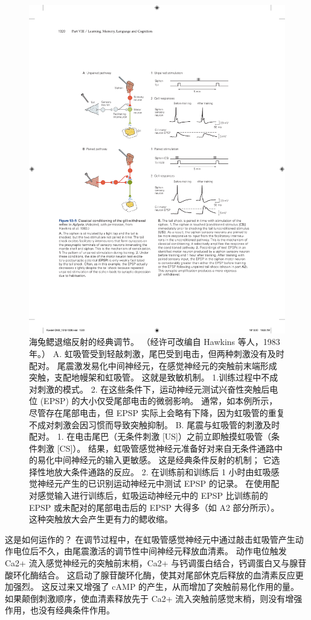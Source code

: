 \begin{figure}[htbp]
	\centering
	\includegraphics[width=0.75\linewidth]{chap53/fig_53_5}
	\caption{海兔鳃退缩反射的经典调节。 （经许可改编自 Hawkins 等人，1983 年。） A. 虹吸管受到轻敲刺激，尾巴受到电击，但两种刺激没有及时配对。 尾震激发易化中间神经元，在感觉神经元的突触前末端形成突触，支配地幔架和虹吸管。 这就是致敏机制。 1.训练过程中不成对刺激的模式。 2. 在这些条件下，运动神经元测试兴奋性突触后电位 (EPSP) 的大小仅受尾部电击的微弱影响。 通常，如本例所示，尽管存在尾部电击，但 EPSP 实际上会略有下降，因为虹吸管的重复不成对刺激会因习惯而导致突触抑制。 B. 尾震与虹吸管的刺激及时配对。 1. 在电击尾巴（无条件刺激 [US]）之前立即触摸虹吸管（条件刺激 [CS]）。 结果，虹吸管感觉神经元准备好对来自无条件通路中的易化中间神经元的输入更敏感。 这是经典条件反射的机制； 它选择性地放大条件通路的反应。 2. 在训练前和训练后 1 小时由虹吸感觉神经元产生的已识别运动神经元中测试 EPSP 的记录。 在使用配对感觉输入进行训练后，虹吸运动神经元中的 EPSP 比训练前的 EPSP 或未配对的尾部电击后的 EPSP 大得多（如 A2 部分所示）。 这种突触放大会产生更有力的鳃收缩。}
	\label{fig:53_5}
\end{figure}

这是如何运作的？ 在调节过程中，在虹吸管感觉神经元中通过敲击虹吸管产生动作电位后不久，由尾震激活的调节性中间神经元释放血清素。 动作电位触发 Ca2+ 流入感觉神经元的突触前末梢，Ca2+ 与钙调蛋白结合，钙调蛋白又与腺苷酸环化酶结合。 这启动了腺苷酸环化酶，使其对尾部休克后释放的血清素反应更加强烈。 这反过来又增强了 cAMP 的产生，从而增加了突触前易化作用的量。 如果颠倒刺激顺序，使血清素释放先于 Ca2+ 流入突触前感觉末梢，则没有增强作用，也没有经典条件作用。

